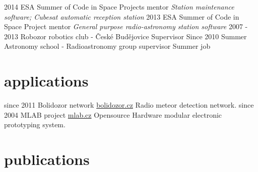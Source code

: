 \documentclass[]{friggeri-cv}
\begin{document}
\begin{entrylist}
  \entry
    {2014}
    {ESA Summer of Code in Space}
    {Projects mentor}
    {\emph{Station maintenance software; Cubesat automatic reception station}}
  \entry
    {2013}
    {ESA Summer of Code in Space}
    {Project mentor}
    {\emph{General purpose radio-astronomy station software}}
  \entry
    {2007 - 2013}
    {Robozor robotics club - České Budějovice}
    {Supervisor}
    {}
  \entry
    {Since 2010}
    {Summer Astronomy school - Radioastronomy group supervisor}
    {Summer job}
    {}
\end{entrylist}

\section{applications}

\begin{entrylist}
  \entry
    {since 2011}
    {Bolidozor network}
    {\href{http://wiki.bolidozor.cz/}{bolidozor.cz}}
    {Radio meteor detection network.}
  \entry
    {since 2004}
    {MLAB project}
    {\href{http://wiki.mlab.cz/}{mlab.cz}}
    {Opensource Hardware modular electronic prototyping system.}

\end{entrylist}

\section{publications}


\begin{refsection}
  \nocite{*}
  \printbibliography[sorting=chronological, type=inproceedings, title={international peer-reviewed conferences/proceedings}, notkeyword={france}, heading=subbibliography]
\end{refsection}
\begin{refsection}
  \nocite{*}
  \printbibliography[sorting=chronological, type=inproceedings, title={local peer-reviewed conferences/proceedings}, keyword={france}, heading=subbibliography]
\end{refsection}
\end{document}
